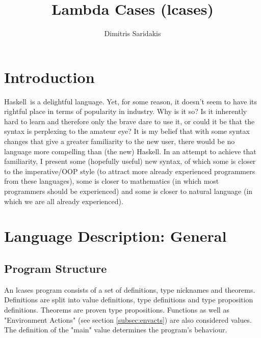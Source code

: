 \documentclass{article}
\date{}
\author{
  Dimitris Saridakis
}
\def\H{Haskell}
\begin{document}
\title{
\textbf{Lambda Cases (lcases)}
}
\maketitle

\tableofcontents

\newpage
\section{Introduction}

\H\ is a delightful language. Yet, for some reason, it doesn't seem to have
its rightful place in terms of popularity in industry. Why is it so?  Is it
inherently hard to learn and therefore only the brave dare to use it, or could
it be that the syntax is perplexing to the amateur eye? It is my belief that
with some syntax changes that give a greater familiarity to the new user, there
would be no language more compelling than (the new) \H. In an attempt to
achieve that familiarity, I present some (hopefully useful) new syntax, of
which some is closer to the imperative/OOP style (to attract more already
experienced programmers from these languages), some is closer to mathematics
(in which most programmers should be experienced) and some is closer to natural
language (in which we are all already experienced). 

\section{Language Description: General}

\subsection{Program Structure}

An lcases program consists of a set of definitions, type nicknames and
theorems.  Definitions are split into value definitions, type definitions and
type proposition definitions. Theorems are proven type propositions. Functions
as well as "Environment Actions" (see section \ref{subsec:envacts}) are also
considered values. The definition of the "main" value determines the program's
behaviour. 
\end{document}
